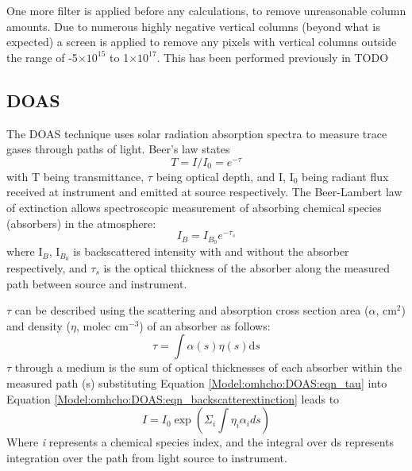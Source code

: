   One more filter is applied before any calculations, to remove unreasonable column amounts.
  Due to numerous highly negative vertical columns (beyond what is expected) a screen is applied to remove any pixels with vertical columns outside the range of -5$\times 10^{15}$ to 1$\times 10^{17}$.
  This has been performed previously in TODO %
  
  \subsection{DOAS}
    \label{Model:omhcho:DOAS}
    
    The DOAS technique uses solar radiation absorption spectra to measure trace gases through paths of light.
    Beer's law states
    \begin{equation} \label{Model:omhcho:DOAS:eqn_beerslaw}
    T = I/I_0 = e^{-\tau}
    \end{equation}
    with T being transmittance, $\tau$ being optical depth, and I, I$_0$ being radiant flux received at instrument and emitted at source respectively.
    The Beer-Lambert law of extinction allows spectroscopic measurement of absorbing chemical species (absorbers) in the atmosphere:
    \begin{equation} \label{Model:omhcho:DOAS:eqn_backscatterextinction}
    I_B = I_{B_0} e^{-\tau_s}
    \end{equation}
    where I$_B$, I$_{B_0}$ is backscattered intensity with and without the absorber respectively, and $\tau_s$ is the optical thickness of the absorber along the measured path between source and instrument.
    
    $\tau$ can be described using the scattering and absorption cross section area ($\alpha$, cm$^{2}$) and density ($\eta$, molec cm$^{-3}$) of an absorber as follows:
    \begin{equation} \label{Model:omhcho:DOAS:eqn_tau}
    \tau = \int \alpha(s) \eta(s) \mathrm{d}s
    \end{equation}
    $\tau$ through a medium is the sum of optical thicknesses of each absorber within the measured path (s)
    substituting Equation \ref{Model:omhcho:DOAS:eqn_tau} into Equation \ref{Model:omhcho:DOAS:eqn_backscatterextinction} leads to
    \begin{equation*}
      I = I_0 \exp { \left( \Sigma_i \int \eta_i \alpha_i ds \right) }
    \end{equation*}
    Where \textit{i} represents a chemical species index, and the integral over ds represents integration over the path from light source to instrument.
    
